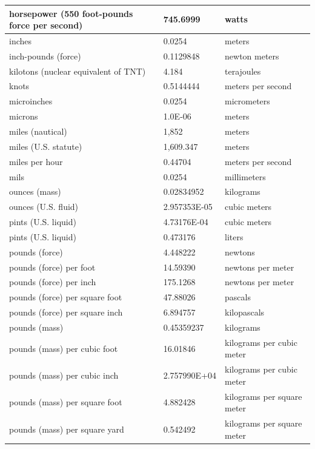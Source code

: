 \documentclass{template/openetcs_report}
\begin{document}
{\begin{longtable}{||l|l|l||}
    \hline
    horsepower (550 foot-pounds force per second) & 745.6999 & watts\\
    \hline
    inches & 0.0254 & meters\\
    \hline
    inch-pounds (force) & 0.1129848 & newton meters\\
    \hline
    kilotons (nuclear equivalent of TNT) & 4.184 & terajoules\\
    \hline
    knots & 0.5144444 & meters per second\\
    \hline
    microinches & 0.0254 & micrometers\\
    \hline
    microns & 1.0E-06 & meters\\
    \hline
    miles (nautical) & 1,852 & meters\\
    \hline
    miles (U.S. statute) & 1,609.347 & meters\\
    \hline
    miles per hour & 0.44704 & meters per second\\
    \hline
    mils & 0.0254 & millimeters\\
    \hline
    ounces (mass) & 0.02834952 & kilograms\\
    \hline
    ounces (U.S. fluid) & 2.957353E-05 & cubic meters\\
    \hline
    pints (U.S. liquid) & 4.73176E-04 & cubic meters\\
    \hline
    pints (U.S. liquid) & 0.473176 & liters\\
    \hline
    pounds (force) & 4.448222 & newtons\\
    \hline
    pounds (force) per foot & 14.59390 & newtons per meter\\
    \hline
    pounds (force) per inch & 175.1268 & newtons per meter\\
    \hline
    pounds (force) per square foot & 47.88026 & pascals\\
    \hline
    pounds (force) per square inch & 6.894757 & kilopascals\\
    \hline
    pounds (mass) & 0.45359237 & kilograms\\
    \hline
    pounds (mass) per cubic foot & 16.01846 & kilograms per cubic meter\\
    \hline
    pounds (mass) per cubic inch & 2.757990E+04 & kilograms per cubic meter\\
    \hline
    pounds (mass) per square foot & 4.882428 & kilograms per square meter\\
    \hline
    pounds (mass) per square yard & 0.542492 & kilograms per square meter\\

\end{longtable}}
\end{document}
